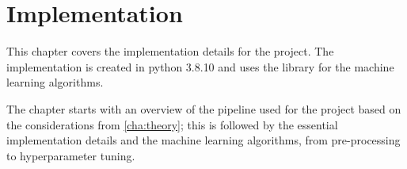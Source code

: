 \chapter{Implementation}\label{cha:implementation}
This chapter covers the implementation details for the project. The implementation is created in python 3.8.10 and uses the  library for the machine learning algorithms.


The chapter starts with an overview of the pipeline used for the project based on the considerations from \autoref{cha:theory}; this is followed by the essential implementation details and the machine learning algorithms, from pre-processing to hyperparameter tuning.






